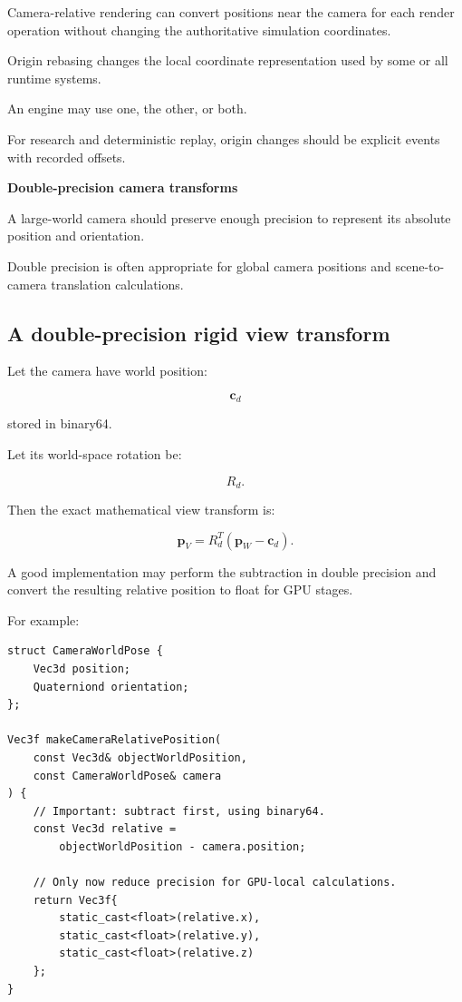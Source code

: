 Camera-relative rendering can convert positions near the camera for each render operation without changing the authoritative simulation coordinates.

Origin rebasing changes the local coordinate representation used by some or all runtime systems.

An engine may use one, the other, or both.

For research and deterministic replay, origin changes should be explicit events with recorded offsets.

\textbf{Double-precision camera transforms}

A large-world camera should preserve enough precision to represent its absolute position and orientation.

Double precision is often appropriate for global camera positions and scene-to-camera translation calculations.

\subsection{A double-precision rigid view transform}\label{02-foundations-ii-ch036-a-double-precision-rigid-view-transform}

Let the camera have world position:

\[
 \mathbf c_d
\]

stored in binary64.

Let its world-space rotation be:

\[
 R_d.
\]

Then the exact mathematical view transform is:

\[
 \boxed{ \mathbf p_V=R_d^T(\mathbf p_W-\mathbf c_d) }.
\]

A good implementation may perform the subtraction in double precision and convert the resulting relative position to float for GPU stages.

For example:

\begin{verbatim}
struct CameraWorldPose {
    Vec3d position;
    Quaterniond orientation;
};

Vec3f makeCameraRelativePosition(
    const Vec3d& objectWorldPosition,
    const CameraWorldPose& camera
) {
    // Important: subtract first, using binary64.
    const Vec3d relative =
        objectWorldPosition - camera.position;

    // Only now reduce precision for GPU-local calculations.
    return Vec3f{
        static_cast<float>(relative.x),
        static_cast<float>(relative.y),
        static_cast<float>(relative.z)
    };
}
\end{verbatim}

